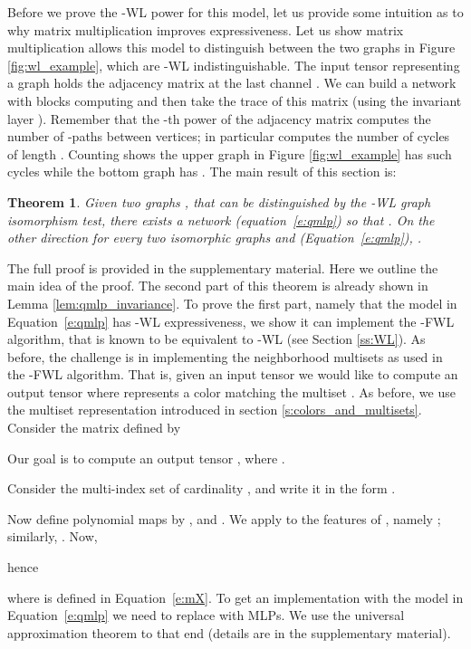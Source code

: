 \documentclass{article}
\newtheorem{theorem}{Theorem}
\def\eqref#1{equation~\ref{#1}}
\def\Eqref#1{Equation~\ref{#1}}
\begin{document}
Before we prove the -WL power for this model, let us provide some intuition as to why matrix multiplication improves expressiveness. Let us show matrix multiplication allows this model to distinguish between the two graphs in Figure \ref{fig:wl_example}, which are -WL indistinguishable. The input tensor  representing a graph  holds the adjacency matrix at the last channel . We can build a network with  blocks computing  and then take the trace of this matrix (using the invariant layer ). Remember that the -th power of the adjacency matrix computes the number of -paths between vertices; in particular  computes the number of cycles of length . Counting shows the upper graph in Figure \ref{fig:wl_example} has  such cycles while the bottom graph has .  The main result of this section is:


\begin{theorem}\label{thm:3_WL}
Given two graphs ,  that can be distinguished by the -WL graph isomorphism test, there exists a network  (\eqref{e:qmlp}) so that . On the other direction for every two isomorphic graphs  and  (\Eqref{e:qmlp}), .
\end{theorem}
The full proof is provided in the supplementary material. Here we outline the main idea of the proof. The second part of this theorem is already shown in Lemma \ref{lem:qmlp_invariance}. To prove the first part, namely that the model in \Eqref{e:qmlp} has -WL expressiveness, we show it can implement the -FWL algorithm, that is known to be equivalent to -WL (see Section \ref{ss:WL}). As before, the challenge is in implementing the neighborhood multisets as used in the -FWL algorithm. That is, given an input tensor  we would like to compute an output tensor  where  represents a color matching the multiset .  
As before, we use the multiset representation introduced in section \ref{s:colors_and_multisets}. Consider the matrix  defined by

Our goal is to compute an output tensor , where . 

Consider the multi-index set  of cardinality , and write it in the form . 

Now define polynomial maps  by , and . We apply  to the features of , namely ; similarly, . Now,

hence
 
where  is defined in \Eqref{e:mX}. To get an implementation with the  model in \Eqref{e:qmlp} we need to replace  with MLPs. We use the universal approximation theorem to that end (details are in the supplementary material). 
\end{document}
